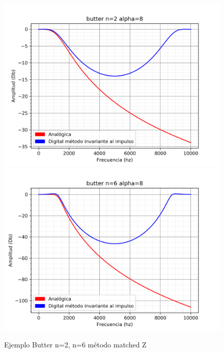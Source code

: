 \documentclass[assd_guia_filtros_recursivos_main.tex]{subfiles}
\begin{document}
\begin{figure}[H]	
	\centering
	\includegraphics[scale=0.4]{output/butter_matched_z/alpha=8/butter_n=2_alpha=8.png}
	\includegraphics[scale=0.4]{output/butter_matched_z/alpha=8/butter_n=6_alpha=8.png}
	\caption{Ejemplo Butter n=2, n=6 método matched Z}
	\label{fig:Caso 5}
\end{figure}
\end{document}
